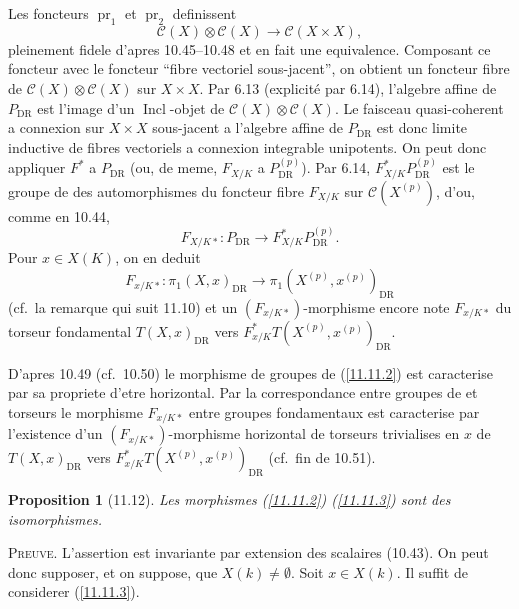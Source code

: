 \documentclass[12pt,a4paper]{article}
\theoremstyle{plain}
\newtheorem{proposition}[theorem]{Proposition}
\theoremstyle{definition}
\theoremstyle{remark}
\DeclareMathOperator{\pr}{pr}
\DeclareMathOperator{\Incl}{Incl}
\newcommand{\DR}{\mathrm{DR}}
\begin{document}
Les foncteurs $\pr_1$ et $\pr_2$ definissent
$$\mathcal{C}(X) \otimes \mathcal{C}(X) \longrightarrow \mathcal{C}(X \times X),$$
pleinement fidele d'apres 10.45--10.48 et en fait une equivalence. Composant ce foncteur avec le foncteur ``fibre vectoriel sous-jacent'', on obtient un foncteur fibre de $\mathcal{C}(X) \otimes \mathcal{C}(X)$ sur $X \times X$. Par 6.13 (explicit\'e par 6.14), l'algebre affine de $P_{\DR}$ est l'image d'un $\Incl$-objet de $\mathcal{C}(X) \otimes \mathcal{C}(X)$. Le faisceau quasi-coherent a connexion sur $X \times X$ sous-jacent a l'algebre affine de $P_{\DR}$ est donc limite inductive de fibres vectoriels a connexion integrable unipotents. On peut donc appliquer $F^*$ a $P_{\DR}$ (ou, de meme, $F_{X/K}$ a $P_{\DR}^{(p)}$). Par 6.14, $F_{X/K}^* P_{\DR}^{(p)}$ est le groupe de des automorphismes du foncteur fibre $F_{X/K}$ sur $\mathcal{C}(X^{(p)})$, d'ou, comme en 10.44,
\begin{equation}\label{11.11.2}
F_{X/K *}: P_{\DR} \longrightarrow F_{X/K}^* P_{\DR}^{(p)}. \tag{11.11.2}
\end{equation}
Pour $x \in X(K)$, on en deduit
\begin{equation}\label{11.11.3}
F_{x/K *}: \pi_1(X, x)_{\DR} \longrightarrow \pi_1(X^{(p)}, x^{(p)})_{\DR} \tag{11.11.3}
\end{equation}
(cf.~la remarque qui suit 11.10) et un $(F_{x/K *})$-morphisme encore note $F_{x/K *}$ du torseur fondamental $T(X, x)_{\DR}$ vers $F_{x/K}^* T(X^{(p)}, x^{(p)})_{\DR}$.

D'apres 10.49 (cf.~10.50) le morphisme de groupes de (\ref{11.11.2}) est caracterise par sa propriete d'etre horizontal. Par la correspondance entre groupes de et torseurs le morphisme $F_{x/K *}$ entre groupes fondamentaux est caracterise par l'existence d'un $(F_{x/K *})$-morphisme horizontal de torseurs trivialises en $x$ de $T(X, x)_{\DR}$ vers $F_{x/K}^* T(X^{(p)}, x^{(p)})_{\DR}$ (cf.~fin de 10.51).

\begin{proposition}[11.12]
Les morphismes (\ref{11.11.2}) (\ref{11.11.3}) sont des isomorphismes.
\end{proposition}

\textsc{Preuve.} L'assertion est invariante par extension des scalaires (10.43). On peut donc supposer, et on suppose, que $X(k) \neq \emptyset$. Soit $x \in X(k)$. Il suffit de considerer (\ref{11.11.3}).
\end{document}
